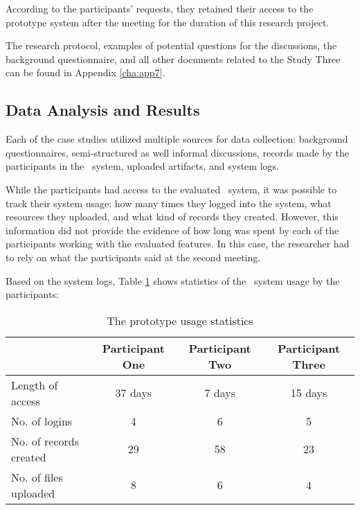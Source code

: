 According to the participants' requests, they retained their access to the
prototype system after the meeting for the duration of this research project.

The research protocol, examples of potential questions for the discussions, the
background questionnaire, and all other documents related to the Study Three can
be found in Appendix \ref{cha:app7}.

\subsection{Data Analysis and Results}

Each of the case studies utilized multiple sources for data collection:
background questionnaires, semi-structured as well informal discussions, records
made by the participants in the \ep~system, uploaded artifacts, and system logs.

While the participants had access to the evaluated \ep~system, it was possible
to track their system usage: how many times they logged into the system, what
resources they uploaded, and what kind of records they created. However, this
information did not provide the evidence of how long was spent by each of the
participants working with the evaluated features. In this case, the researcher
had to rely on what the participants said at the second meeting.

Based on the system logs, Table \ref{tab:study3stats} shows statistics of the
\ep~system usage by the participants:

\begin{table}[htb] \small
\caption{The prototype usage statistics}
\begin{center}
	\begin{tabular} {| p{3.5cm} | c | c | c |}
	 \hline
	 \multicolumn{1}{|c|}{} &
     \multicolumn{1}{c|}{\textbf{Participant One}} & 
     \multicolumn{1}{c|}{\textbf{Participant Two}} & 
     \multicolumn{1}{c|}{\textbf{Participant Three}} \\ \hline
	    Length of access\footnotemark[1] & 37 days & 7 days & 15 days \\ \hline 
	    No. of logins & 4 & 6 & 5 \\ \hline 
	    No. of records created & 29 & 58 & 23 \\ \hline
	    No. of files uploaded & 8 & 6 & 4 \\ \hline
	\end{tabular}
\end{center}
\label{tab:study3stats}
\end{table}

